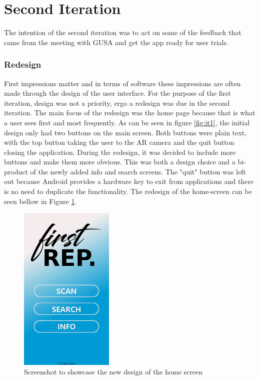\documentclass{l4proj}
\begin{document}
\section{Second Iteration}
The intention of the second iteration was to act on some of the feedback that came from the meeting with GUSA and get the app ready for user trials.

\subsubsection{Redesign}
First impressions matter and in terms of software these impressions are often made through the design of the user interface. For the purpose of the first iteration, design was not a priority, ergo a redesign was due in the second iteration. The main focus of the redesign was the home page because that is what a user sees first and most frequently. As can be seen in figure \ref{fig:it1}, the initial design only had two buttons on the main screen. Both buttons were plain text, with the top button taking the user to the AR camera and the quit button closing the application. During the redesign, it was decided to include more buttons and make them more obvious. This was both a design choice and a bi-product of the newly added info and search screens. The "quit" button was left out because Android provides a hardware key to exit from applications and there is no need to duplicate the functionality. The redesign of the home-screen can be seen bellow in Figure \ref{fig:it2_home}.

\begin{figure}[h]
\centering
\includegraphics[height=8cm]{images/redesigned_homescreen.png}
\caption{Screenshot to showcase the new design of the home screen}
\label{fig:it2_home}
\end{figure}
\end{document}
